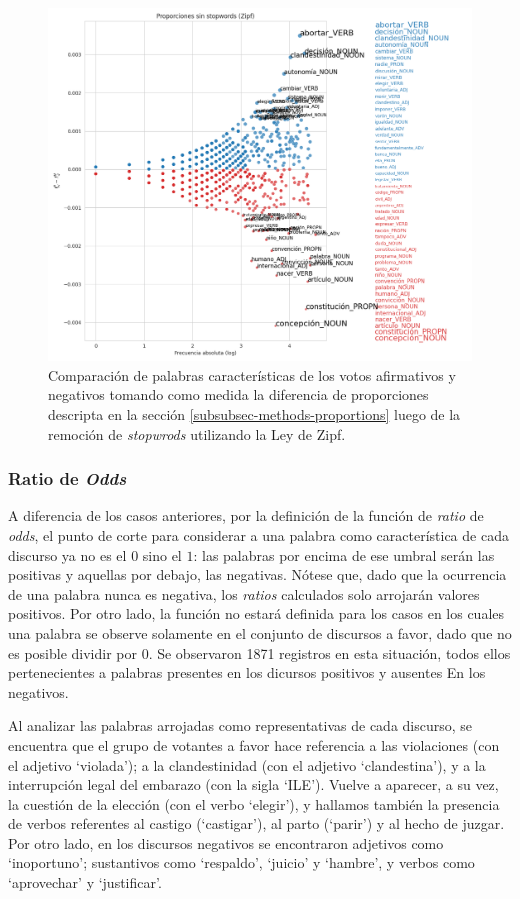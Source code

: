 \begin{figure}[h!]
    \centering
    \includegraphics[scale=0.4]{./images/graphs/proporciones_sin_stopwords_zipf.png}
    \caption{Comparaci\'on de palabras caracter\'isticas de los votos afirmativos y
    negativos tomando como medida la diferencia de proporciones descripta
    en la secci\'on \ref{subsubsec-methods-proportions} luego de la remoci\'on de
    \textit{stopwrods} utilizando la Ley de Zipf.}
    \label{fig-statistics-proportions-zipf}
\end{figure}

\subsubsection{Ratio de \textit{Odds}}
A diferencia de los casos anteriores, por la definici\'on de la funci\'on de
\textit{ratio} de \textit{odds}, el punto de corte para considerar
a una palabra como caracter\'istica de cada discurso ya no es el $0$ sino el $1$:
las palabras por encima de ese umbral ser\'an las positivas y aquellas por debajo,
las negativas. N\'otese que, dado que la ocurrencia de una palabra nunca es negativa,
los \textit{ratios} calculados solo arrojar\'an valores positivos. Por otro lado,
la funci\'on no estar\'a definida para los casos en los cuales una palabra se
observe solamente en el conjunto de discursos a favor, dado que no es posible
dividir por $0$. Se observaron 1871 registros en esta situaci\'on, todos ellos
pertenecientes a palabras presentes en los dicursos positivos y ausentes En
los negativos.
\par
Al analizar las palabras arrojadas como representativas de cada discurso, se
encuentra que el grupo de votantes a favor hace referencia a las violaciones
(con el adjetivo `violada'); a la clandestinidad (con el adjetivo `clandestina'),
y a la interrupci\'on legal del embarazo (con la sigla `ILE'). Vuelve a aparecer,
a su vez, la cuesti\'on de la elecci\'on (con el verbo `elegir'), y hallamos tambi\'en
la presencia de verbos referentes al castigo (`castigar'), al parto (`parir') y
al hecho de juzgar. Por otro lado, en los discursos negativos se encontraron
adjetivos como `inoportuno'; sustantivos como `respaldo', `juicio' y `hambre', 
y verbos como `aprovechar' y `justificar'.

